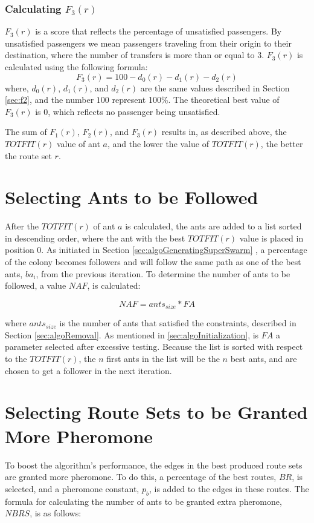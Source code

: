 \subsubsection{Calculating $F_{3}(r)$}
\label{sec:f3}
$F_3(r)$ is a score that reflects the percentage of unsatisfied passengers. By unsatisfied passengers we mean passengers traveling from their origin to their destination, where the number of transfers is more than or equal to 3. $F_3(r)$ is calculated using the following formula:
\newline
$$F_3(r) = 100 - d_0(r) - d_1(r) - d_2(r)$$
\newline
where, $d_0(r)$, $d_1(r)$, and $d_2(r)$ are the same values described in Section \vref{sec:f2}, and the number $100$ represent 100\%. The theoretical best value of $F_3(r)$ is 0, which reflects no passenger being unsatisfied. 

The sum of $F_{1}(r)$, $F_{2}(r)$, and $F_{3}(r)$ results in, as described above, the $TOTFIT(r)$ value of ant $a$, and the lower the value of $TOTFIT(r)$, the better the route set $r$. 

\section{Selecting Ants to be Followed}
\label{sec:selctingAntsToBeFollowed}

After the $TOTFIT(r)$ of ant $a$ is calculated, the ants are added to a list sorted in descending order, where the ant with the best $TOTFIT(r)$ value is placed in position 0. As initiated in Section \vref{sec:algoGeneratingSuperSwarm} , a percentage of the colony becomes followers and will follow the same path as one of the best ants, $ba_i$, from the previous iteration. To determine the number of ants to be followed, a value $NAF$, is calculated:

$$NAF = ants_{size} * FA$$
 
where $ants_{size}$ is the number of ants that satisfied the constraints, described in Section \vref{sec:algoRemoval}. As mentioned in \vref{sec:algoInitialization}, is $FA$ a parameter selected after excessive testing. Because the list is sorted with respect to the $TOTFIT(r)$, the $n$ first ants in the list will be the $n$ best ants, and are chosen to get a follower in the next iteration. 

\section{Selecting Route Sets to be Granted More Pheromone}
To boost the algorithm's performance, the edges in the best produced route sets are granted more pheromone. To do this, a percentage of the best routes, $BR$, is selected, and a pheromone constant, $p_b$, is added to the edges in these routes. 
The formula for calculating the number of ants to be granted extra pheromone, $NBRS$, is as follows:

